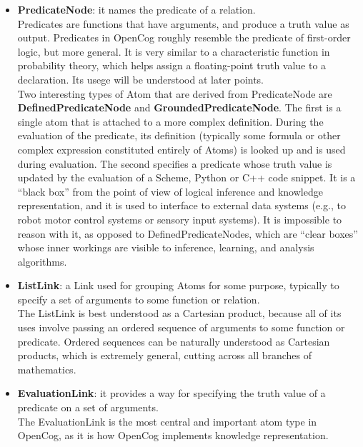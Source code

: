 \begin{itemize}
	\item \textbf{PredicateNode}: it names the predicate of a relation. \\
Predicates are functions that have arguments, and produce a truth value as output. Predicates in OpenCog roughly resemble the predicate of first-order logic, but more general. It is very similar to a characteristic function in probability theory, which helps assign a floating-point truth value to a declaration. Its usege will be understood at later points. \\
Two interesting types of Atom that are derived from PredicateNode are \textbf{DefinedPredicateNode} and \textbf{GroundedPredicateNode}. 
The first is a single atom that is attached to a more complex definition. During the evaluation of the predicate, its definition (typically some formula or other complex expression constituted entirely of Atoms) is looked up and is used during evaluation. 
The second specifies a predicate whose truth value is updated by the evaluation of a Scheme, Python or C++ code snippet. It is a \enquote{black box} from the point of view of logical inference and knowledge representation, and it is used to interface to external data systems (e.g., to robot motor control systems or sensory input systems). It is impossible to reason with it, as opposed to DefinedPredicateNodes, which are \enquote{clear boxes} whose inner workings are visible to inference, learning, and analysis algorithms.

	\item \textbf{ListLink}: a Link used for grouping Atoms for some purpose, typically to specify a set of arguments to some function or relation. \\
The ListLink is best understood as a Cartesian product\footnotemark{}, because all of its uses involve passing an ordered sequence of arguments to some function or predicate. Ordered sequences can be naturally understood as Cartesian products, which is extremely general, cutting across all branches of mathematics.

	\item \textbf{EvaluationLink}: it provides a way for specifying the truth value of a predicate on a set of arguments. \\
The EvaluationLink is the most central and important atom type in OpenCog, as it is how OpenCog implements knowledge representation.


\end{itemize}

